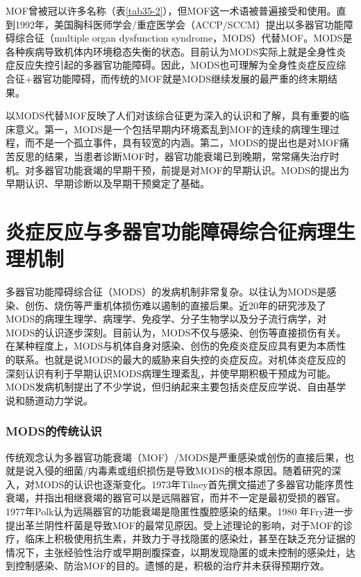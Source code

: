 MOF曾被冠以许多名称（表\ref{tab35-2}），但MOF这一术语被普遍接受和使用。直到1992年，美国胸科医师学会/重症医学会（ACCP/SCCM）提出以多器官功能障碍综合征（multiple
organ dysfunction
syndrome，MODS）代替MOF。MODS是各种疾病导致机体内环境稳态失衡的状态。目前认为MODS实际上就是全身性炎症反应失控引起的多器官功能障碍。因此，MODS也可理解为全身性炎症反应综合征+器官功能障碍，而传统的MOF就是MODS继续发展的最严重的终末期结果。

以MODS代替MOF反映了人们对该综合征更为深入的认识和了解，具有重要的临床意义。第一，MODS是一个包括早期内环境紊乱到MOF的连续的病理生理过程，而不是一个孤立事件，具有较宽的内涵。第二，MODS的提出也是对MOF痛苦反思的结果，当患者诊断MOF时，器官功能衰竭已到晚期，常常痛失治疗时机。对多器官功能衰竭的早期干预，前提是对MOF的早期认识。MODS的提出为早期认识、早期诊断以及早期干预奠定了基础。

\protect\hypertarget{text00093.html}{}{}

\section{炎症反应与多器官功能障碍综合征病理生理机制}

多器官功能障碍综合征（MODS）的发病机制非常复杂。以往认为MODS是感染、创伤、烧伤等严重机体损伤难以遏制的直接后果。近20年的研究涉及了MODS的病理生理学、病理学、免疫学、分子生物学以及分子流行病学，对MODS的认识逐步深刻。目前认为，MODS不仅与感染、创伤等直接损伤有关。在某种程度上，MODS与机体自身对感染、创伤的免疫炎症反应具有更为本质性的联系。也就是说MODS的最大的威胁来自失控的炎症反应。对机体炎症反应的深刻认识有利于早期认识MODS病理生理紊乱，并使早期积极干预成为可能。MODS发病机制提出了不少学说，但归纳起来主要包括炎症反应学说、自由基学说和肠道动力学说。

\subsubsection{MODS的传统认识}

传统观念认为多器官功能衰竭（MOF）/MODS是严重感染或创伤的直接后果，也就是说入侵的细菌/内毒素或组织损伤是导致MODS的根本原因。随着研究的深入，对MODS的认识也逐渐变化。1973年Tilney首先撰文描述了多器官功能序贯性衰竭，并指出相继衰竭的器官可以是远隔器官，而并不一定是最初受损的器官。1977年Polk认为远隔器官的功能衰竭是隐匿性腹腔感染的结果。1980
年Fry进一步提出革兰阴性杆菌是导致MOF的最常见原因。受上述理论的影响，对于MOF的诊疗，临床上积极使用抗生素，并致力于寻找隐匿的感染灶，甚至在缺乏充分证据的情况下，主张经验性治疗或早期剖腹探查，以期发现隐匿的或未控制的感染灶，达到控制感染、防治MOF的目的。遗憾的是，积极的治疗并未获得预期疗效。


